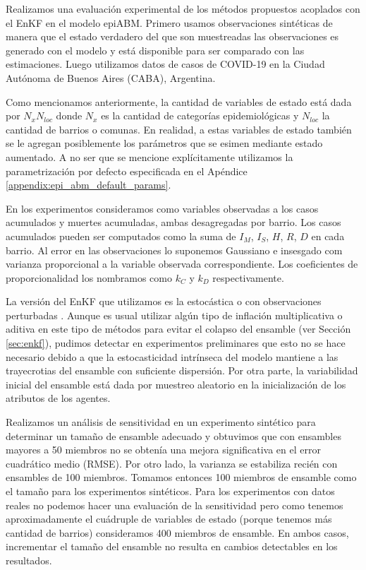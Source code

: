 Realizamos una evaluación experimental de los métodos propuestos acoplados con el EnKF en el modelo epiABM. Primero usamos observaciones sintéticas de manera que el estado verdadero del que son muestreadas las observaciones es generado con el modelo y está disponible para ser comparado con las estimaciones. Luego utilizamos datos de casos de COVID-19 en la Ciudad Autónoma de Buenos Aires (CABA), Argentina. 

Como mencionamos anteriormente, la cantidad de variables de estado está dada por $N_x N_{loc}$ donde $N_x$ es la cantidad de categorías epidemiológicas y $N_{loc}$ la cantidad de barrios o comunas. En realidad, a estas variables de estado también se le agregan posiblemente los parámetros que se esimen mediante estado aumentado. A no ser que se mencione explícitamente utilizamos la parametrización por defecto especificada en el Apéndice \ref{appendix:epi_abm_default_params}.

En los experimentos consideramos como variables observadas a los casos acumulados y muertes acumuladas, ambas desagregadas por barrio. Los casos acumulados pueden ser computados como la suma de $I_M$, $I_S$, $H$, $R$, $D$ en cada barrio. Al error en las observaciones lo suponemos Gaussiano e insesgado com varianza proporcional a la variable observada correspondiente. Los coeficientes de proporcionalidad los nombramos como $k_C$ y $k_D$ respectivamente.

La versión del EnKF que utilizamos es la estocástica o con observaciones perturbadas \citep{Burgers1998}. Aunque es usual utilizar algún tipo de inflación multiplicativa o aditiva en este tipo de métodos para evitar el colapso del ensamble (ver Sección \ref{sec:enkf}), pudimos detectar en experimentos preliminares que esto no se hace necesario debido a que la estocasticidad intrínseca del modelo mantiene a las trayecrotias del ensamble con suficiente dispersión. Por otra parte, la variabilidad inicial del ensamble está dada por muestreo aleatorio en la inicialización de los atributos de los agentes.

Realizamos un análisis de sensitividad en un experimento sintético para determinar un tamaño de ensamble adecuado y obtuvimos que con ensambles mayores a 50 miembros no se obtenía una mejora significativa en el error cuadrático medio (RMSE). Por otro lado, la varianza se estabiliza recién con ensambles de 100 miembros. Tomamos entonces 100 miembros de ensamble como el tamaño para los experimentos sintéticos. Para los experimentos con datos reales no podemos hacer una evaluación de la sensitividad pero como tenemos aproximadamente el cuádruple de variables de estado (porque tenemos más cantidad de barrios) consideramos 400 miembros de ensamble. En ambos casos, incrementar el tamaño del ensamble no resulta en cambios detectables en los resultados.

